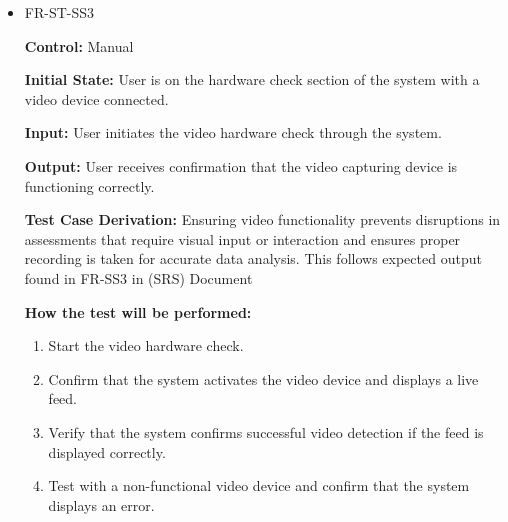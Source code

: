 \documentclass[12pt, titlepage]{article}
\begin{document}
\begin{itemize}
  \item FR-ST-SS3
    \begin{mdframed}[linewidth=0.5mm]
      \textbf{Control:} Manual \par
      \textbf{Initial State:} User is on the hardware check section of the system with a video device connected. \par
      \textbf{Input:} User initiates the video hardware check through the system. \par
      \textbf{Output:} User receives confirmation that the video capturing device is functioning correctly. \par
      \textbf{Test Case Derivation:} Ensuring video functionality prevents disruptions in assessments that require 
      visual input or interaction and ensures 
      proper recording is taken for accurate data analysis. This follows expected output found in FR-SS3 in (SRS) Document \par
      \textbf{How the test will be performed:}
      \begin{enumerate}[noitemsep]
        \item Start the video hardware check.
        \item Confirm that the system activates the video device and displays a live feed.
        \item Verify that the system confirms successful video detection if the feed is displayed correctly.
        \item Test with a non-functional video device and confirm that the system displays an error.
      \end{enumerate}
    \end{mdframed}


\end{itemize}
\end{document}
